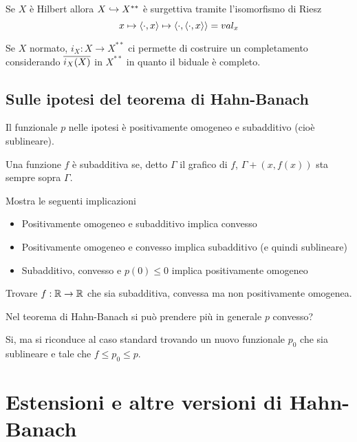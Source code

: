 \begin{remark}
Se $X$ \`e Hilbert allora $X\hookrightarrow X^{\ast\ast}$ \`e surgettiva tramite l'isomorfismo di Riesz
\[x\mapsto \left\langle {\cdot,x}\right\rangle\mapsto \left\langle {\cdot,\left\langle {\cdot,x}\right\rangle}\right\rangle=val_x\]
\end{remark}

\begin{remark}
Se $X$ normato, $i_X:X\to X^{\ast\ast}$ ci permette di costruire un completamento considerando $\overline{i_X(X)}$ in $X^{\ast\ast}$ in quanto il biduale \`e completo.
\end{remark}


\subsection{Sulle ipotesi del teorema di Hahn-Banach}

Il funzionale $p$ nelle ipotesi \`e positivamente omogeneo e subadditivo (cio\`e sublineare).

\begin{remark}
Una funzione $f$ \`e subadditiva se, detto $\Gamma$ il grafico di $f$, $\Gamma+(x,f(x))$ sta sempre sopra $\Gamma$.
\end{remark}

\begin{exercise}
Mostra le seguenti implicazioni
\begin{itemize}
    \item Positivamente omogeneo e subadditivo implica convesso
    \item Positivamente omogeneo e convesso implica subadditivo (e quindi sublineare)
    \item Subadditivo, convesso e $p(0)\leq 0$ implica positivamente omogeneo
\end{itemize}
\end{exercise}

\begin{exercise}
Trovare $f:\mathbb{R}\to \mathbb{R}$ che sia subadditiva, convessa ma non positivamente omogenea.
\end{exercise}

\begin{exercise}
Nel teorema di Hahn-Banach si pu\`o prendere pi\`u in generale $p$ convesso?

Si, ma si riconduce al caso standard trovando un nuovo funzionale $p_0$ che sia sublineare e tale che $f\leq p_0\leq p$.
\end{exercise}

\section{Estensioni e altre versioni di Hahn-Banach}

